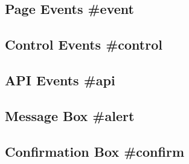 \newpage
\subsection{Page Events \#event}

\subsection{Control Events \#control}

\subsection{API Events \#api}

\subsection{Message Box \#alert}

\subsection{Confirmation Box \#confirm}


